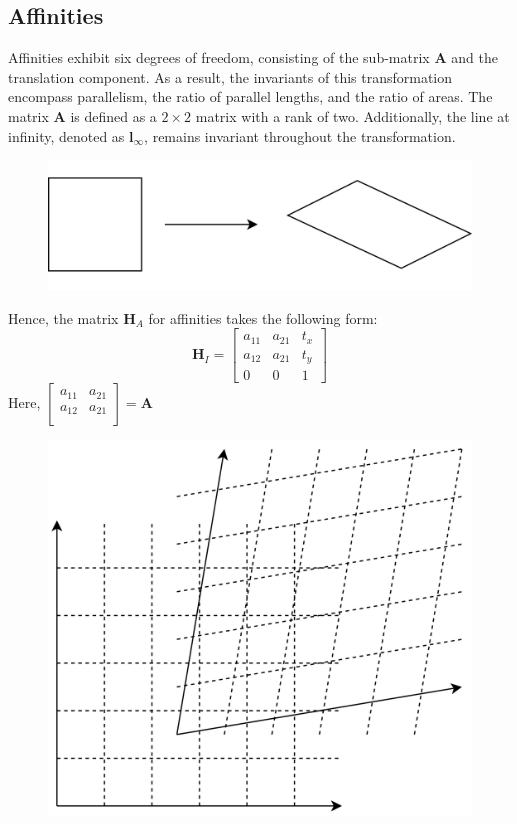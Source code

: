 \subsection{Affinities}
Affinities exhibit six degrees of freedom, consisting of the sub-matrix $\mathbf{A}$ and the translation component. 
As a result, the invariants of this transformation encompass parallelism, the ratio of parallel lengths, and the ratio of areas. 
The matrix $\mathbf{A}$ is defined as a $2 \times 2$ matrix with a rank of two. 
Additionally, the line at infinity, denoted as $\mathbf{l}_{\infty}$, remains invariant throughout the transformation.
\begin{figure}[H]
    \centering
    \includegraphics[width=0.25\linewidth]{images/affinities.png}
\end{figure}
Hence, the matrix $\mathbf{H}_A$ for affinities takes the following form:
\[\mathbf{H}_I=
\begin{bmatrix}
    a_{11} & a_{21} & t_x \\
    a_{12} & a_{21} & t_y \\
    0 & 0 & 1
\end{bmatrix}\]
Here, $
\begin{bmatrix}
    a_{11} & a_{21} \\
    a_{12} & a_{21} \\
\end{bmatrix}
=\mathbf{A}$
\begin{figure}[H]
    \centering
    \includegraphics[width=0.25\linewidth]{images/affinities1.png}
\end{figure}


